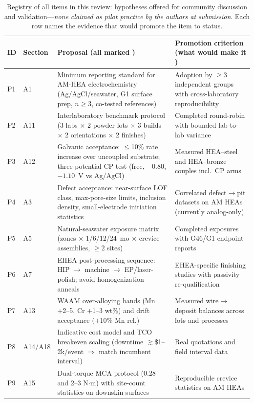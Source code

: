 \begin{table}[t]
\centering
\caption{Registry of all \prop{} items in this review: hypotheses offered for community discussion and validation---\emph{none claimed as pilot practice by the authors at submission}. Each row names the evidence that would promote the item to \evid{} status.}
\label{tab:proposals}
\footnotesize
\begin{tabularx}{\textwidth}{@{}llXX@{}}
\toprule
ID & Section & Proposal (all marked \prop{}) & Promotion criterion (what would make it \evid{}) \\
\midrule
P1 & A1 & Minimum reporting standard for AM-HEA electrochemistry (Ag/AgCl/seawater, G1 surface prep, $n\geq3$, co-tested references) & Adoption by $\geq$3 independent groups with cross-laboratory reproducibility \\
P2 & A11 & Interlaboratory benchmark protocol (3 labs $\times$ 2 powder lots $\times$ 3 builds $\times$ 2 orientations $\times$ 2 finishes) & Completed round-robin with bounded lab-to-lab variance \\
P3 & A12 & Galvanic acceptance: $\leq$10\% rate increase over uncoupled substrate; three-potential CP test (free, $-0.80$, $-1.10$~V vs Ag/AgCl) & Measured HEA--steel and HEA--bronze couples incl.\ CP arms \\
P4 & A3 & Defect acceptance: near-surface LOF class, max-pore-size limits, inclusion density, small-electrode initiation statistics & Correlated defect$\to$pit datasets on AM HEAs (currently analog-only) \\
P5 & A5 & Natural-seawater exposure matrix (zones $\times$ 1/6/12/24~mo $\times$ crevice assemblies, $\geq$2 sites) & Completed exposures with G46/G1 endpoint reports \\
P6 & A7 & EHEA post-processing sequence: HIP $\to$ machine $\to$ EP/laser-polish; avoid homogenization anneals & EHEA-specific finishing studies with passivity re-qualification \\
P7 & A13 & WAAM over-alloying bands (Mn +2--5, Cr +1--3 wt\%) and drift acceptance ($\pm$10\% Mn rel.) & Measured wire$\to$deposit balances across lots and processes \\
P8 & A14/A18 & Indicative cost model and TCO breakeven scaling (downtime $\gtrsim$\$1--2k/event $\Rightarrow$ match incumbent interval) & Real quotations and field interval data \\
P9 & A15 & Dual-torque MCA protocol (0.28 and 2--3 N$\cdot$m) with site-count statistics on downskin surfaces & Reproducible crevice statistics on AM HEAs \\

\end{tabularx}
\end{table}
